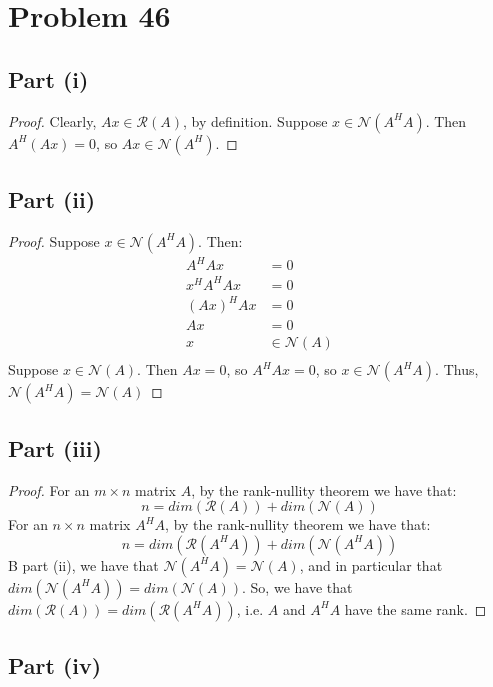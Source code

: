 \documentclass{article}
\begin{document}
\section*{Problem 46}

\subsection*{Part (i)}

\begin{proof}
Clearly, $Ax \in \mathcal{R}(A)$, by definition. Suppose $x \in \mathcal{N}(A^{H}A)$. Then $A^{H}(Ax) = 0$, so $Ax \in \mathcal{N}(A^{H})$.
\end{proof}

\subsection*{Part (ii)}

\begin{proof}
Suppose $x \in \mathcal{N}(A^{H}A)$. Then:
\begin{align*}
A^{H}Ax &= 0 \\
x^{H}A^{H}Ax &= 0 \\
(Ax)^{H}Ax &= 0 \\
Ax &= 0 \\
x &\in \mathcal{N}(A) \\
\end{align*}
Suppose $x \in \mathcal{N}(A)$. Then $Ax = 0$, so $A^{H}Ax = 0$, so $x \in \mathcal{N}(A^{H}A)$.
Thus, $\mathcal{N}(A^{H}A) = \mathcal{N}(A)$
\end{proof}

\subsection*{Part (iii)}

\begin{proof}
For an $m \times n$ matrix $A$, by the rank-nullity theorem we have that:
$$n = dim(\mathcal{R}(A)) + dim(\mathcal{N}(A))$$
For an $n \times n$ matrix $A^{H}A$, by the rank-nullity theorem we have that:
$$n = dim(\mathcal{R}(A^{H}A)) + dim(\mathcal{N}(A^{H}A))$$
B part (ii), we have that $\mathcal{N}(A^{H}A) = \mathcal{N}(A)$, and in particular that $dim(\mathcal{N}(A^{H}A)) = dim(\mathcal{N}(A))$. So, we have that $dim(\mathcal{R}(A)) = dim(\mathcal{R}(A^{H}A))$, i.e. $A$ and $A^{H}A$ have the same rank.
\end{proof}

\subsection*{Part (iv)}
\end{document}
